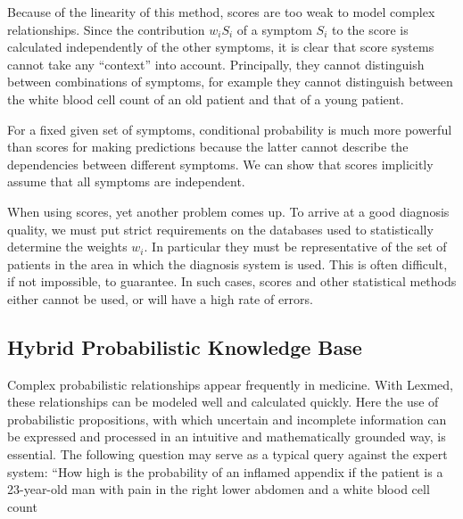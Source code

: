 \documentclass[10pt]{book}
\begin{document}
Because of the linearity of this method, scores are too weak to model complex relationships. Since the contribution $w_{i} S_{i}$ of a symptom $S_{i}$ to the score is calculated independently of the other symptoms, it is clear that score systems cannot take any ``context'' into account. Principally, they cannot distinguish between combinations of symptoms, for example they cannot distinguish between the white blood cell count of an old patient and that of a young patient.

For a fixed given set of symptoms, conditional probability is much more powerful than scores for making predictions because the latter cannot describe the dependencies between different symptoms. We can show that scores implicitly assume that all symptoms are independent.

When using scores, yet another problem comes up. To arrive at a good diagnosis quality, we must put strict requirements on the databases used to statistically determine the weights $w_{i}$. In particular they must be representative of the set of patients in the area in which the diagnosis system is used. This is often difficult, if not impossible, to guarantee. In such cases, scores and other statistical methods either cannot be used, or will have a high rate of errors.

\subsection{Hybrid Probabilistic Knowledge Base}
Complex probabilistic relationships appear frequently in medicine. With Lexmed, these relationships can be modeled well and calculated quickly. Here the use of probabilistic propositions, with which uncertain and incomplete information can be expressed and processed in an intuitive and mathematically grounded way, is essential. The following question may serve as a typical query against the expert system: ``How high is the probability of an inflamed appendix if the patient is a 23-year-old man with pain in the right lower abdomen and a white blood cell count
\end{document}
